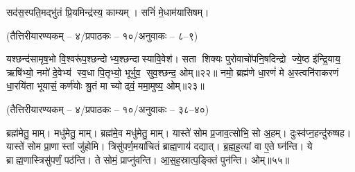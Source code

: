 \fontsize{19pt}{23pt}\selectfont
{}
\newcommand{\anuvakamend}{\refstepcounter{anuvakam}\\[-0.8ex]
\rule[0.5ex]{0.93\textwidth}{1.5pt}\bfseries{[\devanumber{\arabic{anuvakam}}]}%
}
\setlength{\emergencystretch}{3em}


\clearpage

\clearpage

\clearpage
 
\clearpage
 
\closesection

\clearpage
 
\clearpage
 
 \vspace{-1ex}
सद॑स॒स्पति॒मद्भु॑तं प्रि॒यमिन्द्र॑स्य॒ काम्यम्। सनिं॑ मे॒धाम॑यासिषम्।

\vspace{-1.5ex}
\centerline{\normalsize (तैत्तिरीयारण्यकम् – ४/प्रपाठकः – १०/अनुवाकः – ८–९)}
यश्छन्द॑सामृष॒भो वि॒श्वरू॑प॒श्छन्दोभ्य॒श्छन्दास्यावि॒वेश॑। सता शिक्यः पुरोवाचो॑पनि॒षदिन्द्रो ज्ये॒ष्ठ इ॑न्द्रि॒याय॒ ऋषि॑भ्यो॒ नमो॑ दे॒वेभ्य॑ स्व॒धा पि॒तृभ्यो॒ भूर्भुव॒ सुव॒श्छन्द॒ ओम्॥२२॥ नमो॒ ब्रह्म॑णे धा॒रणं॑ मे अ॒स्त्वनि॑राकरणं धा॒रयि॑ता भूयासं॒ कर्ण॑योः श्रु॒तं मा च्योढ्वं॒ ममा॒मुष्य॒ ओम्॥२३॥
\clearpage
 
\clearpage
 
\clearpage
 
\clearpage
 
\clearpage
 
\clearpage
 
\clearpage

\vspace{-1ex}
\centerline{\normalsize (तैत्तिरीयारण्यकम् – ४/प्रपाठकः – १०/अनुवाकः – ३८–४०)}
ब्रह्म॑मेतु॒ माम्। मधु॑मेतु॒ माम्। ब्रह्म॑मे॒व मधु॑मेतु॒ माम्। यास्ते॑ सोम प्र॒जाव॒त्सोभि॒ सो अ॒हम्। दुःस्व॑प्न॒हन्दु॑रुष्षह। यास्ते॑ सोम प्रा॒णास्तां जु॑होमि। त्रिसु॑पर्ण॒मया॑चितं ब्राह्म॒णाय॑ दद्यात्। ब्र॒ह्म॒ह॒त्यां वा ए॒ते घ्न॑न्ति। ये ब्राह्म॒णास्त्रिसु॑पर्णं॒ पठ॑न्ति। ते सोमं॒ प्राप्नु॑वन्ति। आ॒स॒ह॒स्रात्प॒ङ्क्तिं पुन॑न्ति। ओम्॥५५॥

